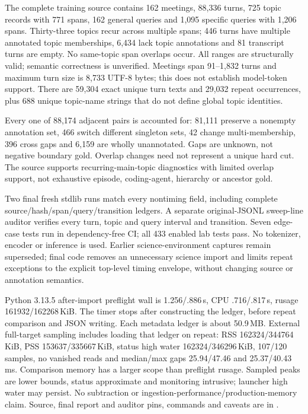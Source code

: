 \documentclass[11pt]{article}
\begin{document}
The complete training source contains 162 meetings, 88,336 turns, 725 topic
records with 771 spans, 162 general queries and 1,095 specific queries with 1,206
spans. Thirty-three topics recur across multiple spans; 446 turns have multiple
annotated topic memberships, 6,434 lack topic annotations and 81 transcript
turns are empty. No same-topic span overlaps occur. All ranges are structurally
valid; semantic correctness is unverified. Meetings span 91--1,832 turns and
maximum turn size is 8,733 UTF-8 bytes; this does not establish model-token
support. There are 59,304 exact unique turn texts and 29,032 repeat occurrences,
plus 688 unique topic-name strings that do not define global topic identities.

Every one of 88,174 adjacent pairs is accounted for: 81,111 preserve a nonempty
annotation set, 466 switch different singleton sets, 42 change multi-membership,
396 cross gaps and 6,159 are wholly unannotated. Gaps are unknown, not negative
boundary gold. Overlap changes need not represent a unique hard cut. The source
supports recurring-main-topic diagnostics with limited overlap support, not
exhaustive episode, coding-agent, hierarchy or ancestor gold.

Two final fresh stdlib runs match every nontiming field, including complete
source/hash/span/query/transition ledgers. A separate original-JSONL sweep-line
auditor verifies every turn, topic and query interval and transition. Seven
edge-case tests run in dependency-free CI; all 433 enabled lab tests pass.
No tokenizer, encoder or inference is used. Earlier science-environment captures
remain superseded; final code removes an unnecessary science import and limits
repeat exceptions to the explicit top-level timing envelope, without changing
source or annotation semantics.

Python 3.13.5 after-import preflight wall is 1.256/.886\,s, CPU .716/.817\,s,
rusage 161932/162268\,KiB. The timer stops after constructing the ledger, before
repeat comparison and JSON writing. Each metadata ledger is about 50.9\,MB.
External full-target sampling includes loading that ledger on repeat: RSS
162324/344764\,KiB, PSS 153637/335667\,KiB, status high water
162324/346296\,KiB, 107/120 samples, no vanished reads and median/max gaps
25.94/47.46 and 25.37/40.43\,ms. Comparison memory has a larger scope than
preflight rusage. Sampled peaks are lower bounds, status approximate and
monitoring intrusive; launcher high water may persist. No subtraction or
ingestion-performance/production-memory claim. Source, final report and auditor
pins, commands and caveats are in
.
\end{document}
